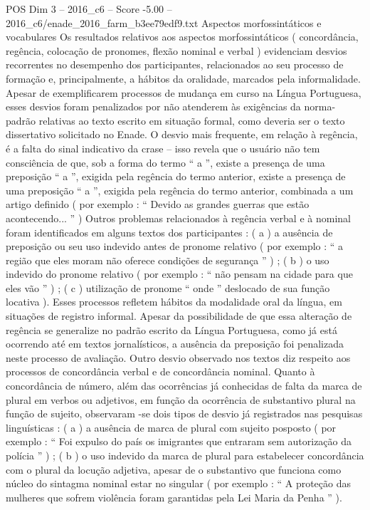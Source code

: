 \begin{textsample}{POS Dim 3 – 2016\_c6 – Score -5.00 – 2016\_c6/enade\_2016\_farm\_b3ee79edf9.txt}
Aspectos morfossintáticos e vocabulares Os resultados relativos aos aspectos morfossintáticos ( concordância, regência, colocação de pronomes, flexão nominal e verbal ) evidenciam desvios recorrentes no desempenho dos participantes, relacionados ao seu processo de formação e, principalmente, a hábitos da oralidade, marcados pela informalidade.
Apesar de exemplificarem processos de mudança em curso na Língua Portuguesa, esses desvios foram penalizados por não atenderem às exigências da norma-padrão relativas ao texto escrito em situação formal, como deveria ser o texto dissertativo solicitado no Enade.
O desvio mais frequente, em relação à regência, é a falta do sinal indicativo da crase – isso revela que o usuário não tem consciência de que, sob a forma do termo “ a ”, existe a presença de uma preposição “ a ”, exigida pela regência do termo anterior, existe a presença de uma preposição “ a ”, exigida pela regência do termo anterior, combinada a um artigo definido ( por exemplo : “ Devido as grandes guerras que estão acontecendo... ” ) Outros problemas relacionados à regência verbal e à nominal foram identificados em alguns textos dos participantes : ( a ) a ausência de preposição ou seu uso indevido antes de pronome relativo ( por exemplo : “ a região que eles moram não oferece condições de segurança ” ) ; ( b ) o uso indevido do pronome relativo ( por exemplo : “ não pensam na cidade para que eles vão ” ) ; ( c ) utilização de pronome “ onde ” deslocado de sua função locativa ).
Esses processos refletem hábitos da modalidade oral da língua, em situações de registro informal.
Apesar da possibilidade de que essa alteração de regência se generalize no padrão escrito da Língua Portuguesa, como já está ocorrendo até em textos jornalísticos, a ausência da preposição foi penalizada neste processo de avaliação.
Outro desvio observado nos textos diz respeito aos processos de concordância verbal e de concordância nominal.
Quanto à concordância de número, além das ocorrências já conhecidas de falta da marca de plural em verbos ou adjetivos, em função da ocorrência de substantivo plural na função de sujeito, observaram -se dois tipos de desvio já registrados nas pesquisas linguísticas : ( a ) a ausência de marca de plural com sujeito posposto ( por exemplo : “ Foi expulso do país os imigrantes que entraram sem autorização da polícia ” ) ; ( b ) o uso indevido da marca de plural para estabelecer concordância com o plural da locução adjetiva, apesar de o substantivo que funciona como núcleo do sintagma nominal estar no singular ( por exemplo : “ A proteção das mulheres que sofrem violência foram garantidas pela Lei Maria da Penha ” ).

\end{textsample}
